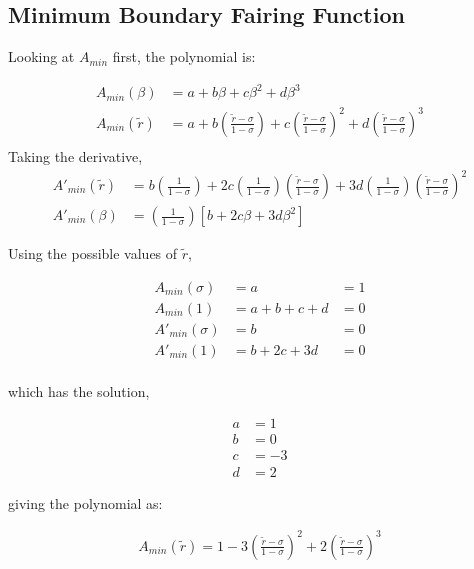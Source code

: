 \subsection{Minimum Boundary Fairing Function}

Looking at $A_{min}$ first, the polynomial is:

\begin{align*}
    A_{min} \left( \beta \right) &= 
    a + b \beta + c \beta^2 + d \beta^3                   \\
    A_{min} \left( \widetilde{r} \right) &= 
    a + b \left( \frac{\widetilde{r} - \sigma}{1 - \sigma} \right)+
    c\left( \frac{\widetilde{r} - \sigma}{1 - \sigma} \right)  ^2+
    d\left( \frac{\widetilde{r} - \sigma}{1 - \sigma} \right)^3                    \\
\end{align*}
Taking the derivative,
\begin{align*}
    A'_{min} \left( \widetilde{r} \right) &= 
    b \left( \frac{1}{1 - \sigma} \right)+
    2 c\left( \frac{1}{1 - \sigma} \right)\left( \frac{\widetilde{r} - \sigma}{1 - \sigma} \right)  +
    3 d\left( \frac{1}{1-\sigma} \right)\left( \frac{\widetilde{r} - \sigma}{1 - \sigma} \right)^2\\
    A'_{min} \left( \beta \right) &= 
    \left( \frac{1}{1 - \sigma} \right)
    \left[
    b +
    2 c \beta + 
    3 d \beta^2
    \right]
\end{align*}

Using the possible values of $\widetilde{r}$,

\begin{align*}
    A_{min}(\sigma) &= a &= 1 \\
    A_{min}(1) &= a + b + c + d  &= 0 \\
    A'_{min}(\sigma) &=  b    &= 0 \\
    A'_{min}(1) &=  b + 2 c + 3 d    &= 0 \\
\end{align*}


which has the solution,

\begin{align*}
    a &= 1 \\
    b &= 0 \\
    c &= -3 \\
    d &= 2 
\end{align*}

giving the polynomial as: 

\begin{align*}
    A_{min} (\widetilde{r}) = 1 - 3 \left(  \frac{\widetilde{r} - \sigma }{ 1 - \sigma}\right)^2 +
    2 \left( \frac{\widetilde{r} - \sigma}{1 - \sigma} \right)^3 
\end{align*}

